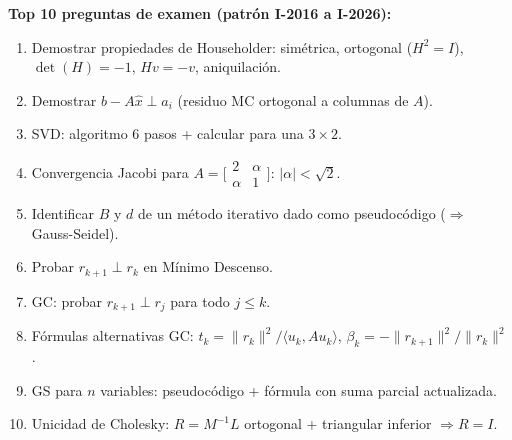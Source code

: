 \documentclass[12pt,a4paper]{article}
\begin{document}
\begin{resultado}
\textbf{Top 10 preguntas de examen (patrón I-2016 a I-2026):}
\begin{enumerate}[noitemsep]
  \item Demostrar propiedades de Householder: simétrica, ortogonal ($H^2=I$), $\det(H)=-1$, $Hv=-v$, aniquilación.
  \item Demostrar $b-A\hat x\perp a_i$ (residuo MC ortogonal a columnas de $A$).
  \item SVD: algoritmo 6 pasos + calcular para una $3\times2$.
  \item Convergencia Jacobi para $A=\bigl[\begin{smallmatrix}2&\alpha\\\alpha&1\end{smallmatrix}\bigr]$: $|\alpha|<\sqrt2$.
  \item Identificar $B$ y $d$ de un método iterativo dado como pseudocódigo ($\Rightarrow$ Gauss-Seidel).
  \item Probar $r_{k+1}\perp r_k$ en Mínimo Descenso.
  \item GC: probar $r_{k+1}\perp r_j$ para todo $j\le k$.
  \item Fórmulas alternativas GC: $t_k=\|r_k\|^2/\langle u_k,Au_k\rangle$, $\beta_k=-\|r_{k+1}\|^2/\|r_k\|^2$.
  \item GS para $n$ variables: pseudocódigo + fórmula con suma parcial actualizada.
  \item Unicidad de Cholesky: $R=M^{-1}L$ ortogonal + triangular inferior $\Rightarrow R=I$.
\end{enumerate}
\end{resultado}
\end{document}
